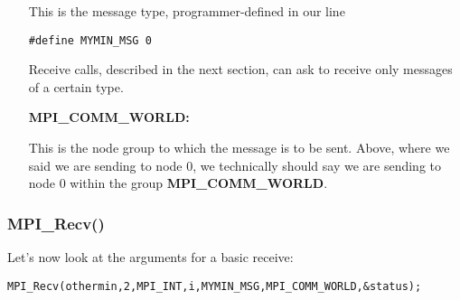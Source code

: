 \begin{itemize}
This is the message type, programmer-defined in our line

\begin{Verbatim}[fontsize=\relsize{-2}]
#define MYMIN_MSG 0
\end{Verbatim}

Receive calls, described in the next section, can ask to receive only
messages of a certain type.

\item [{\bf MPI\_COMM\_WORLD:}]

This is the node group to which the message is to be sent.  Above, where
we said we are sending to node 0, we technically should say we are
sending to node 0 within the group {\bf MPI\_COMM\_WORLD}.

\end{itemize}

\subsubsection{MPI\_Recv()}

Let's now look at the arguments for a basic receive:

\begin{Verbatim}[fontsize=\relsize{-2}]
MPI_Recv(othermin,2,MPI_INT,i,MYMIN_MSG,MPI_COMM_WORLD,&status);
\end{Verbatim}

